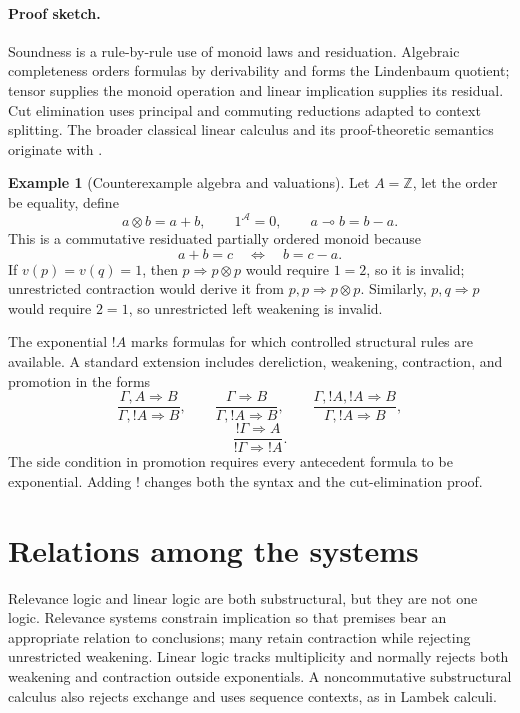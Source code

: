 \documentclass[11pt,oneside,openany]{book}
\theoremstyle{definition}
\newtheorem{example}[definition]{Example}
\theoremstyle{plain}
\theoremstyle{remark}
\newcommand{\Z}{\mathbb{Z}}
\begin{document}
\paragraph{Proof sketch.}
Soundness is a rule-by-rule use of monoid laws and residuation.  Algebraic
completeness orders formulas by derivability and forms the Lindenbaum quotient;
tensor supplies the monoid operation and linear implication supplies its
residual.  Cut elimination uses principal and commuting reductions adapted to
context splitting.  The broader classical linear calculus and its
proof-theoretic semantics originate with \cite{Girard1987}.

\begin{example}[Counterexample algebra and valuations]
Let \(A=\Z\), let the order be equality, define
\[
  a\otimes b=a+b,
  \qquad
  1^{\mathcal A}=0,
  \qquad
  a\multimap b=b-a.
\]
This is a commutative residuated partially ordered monoid because
\[
  a+b=c\quad\Longleftrightarrow\quad b=c-a.
\]
If \(v(p)=v(q)=1\), then \(p\Rightarrow p\otimes p\) would require
\(1=2\), so it is invalid; unrestricted contraction would derive it from
\(p,p\Rightarrow p\otimes p\).  Similarly, \(p,q\Rightarrow p\) would require
\(2=1\), so unrestricted left weakening is invalid.
\end{example}

The exponential \(!A\) marks formulas for which controlled structural rules
are available.  A standard extension includes dereliction, weakening,
contraction, and promotion in the forms
\[
\frac{\Gamma,A\Rightarrow B}{\Gamma,!A\Rightarrow B},
\qquad
\frac{\Gamma\Rightarrow B}{\Gamma,!A\Rightarrow B},
\qquad
\frac{\Gamma,!A,!A\Rightarrow B}{\Gamma,!A\Rightarrow B},
\]
\[
  \frac{!\Gamma\Rightarrow A}{!\Gamma\Rightarrow !A}.
\]
The side condition in promotion requires every antecedent formula to be
exponential.  Adding \(!\) changes both the syntax and the cut-elimination
proof.

\section{Relations among the systems}
\label{sec:relevance-linear-04}

Relevance logic and linear logic are both substructural, but they are not one
logic.  Relevance systems constrain implication so that premises bear an
appropriate relation to conclusions; many retain contraction while rejecting
unrestricted weakening.  Linear logic tracks multiplicity and normally rejects
both weakening and contraction outside exponentials.  A noncommutative
substructural calculus also rejects exchange and uses sequence contexts, as in
Lambek calculi.
\end{document}
